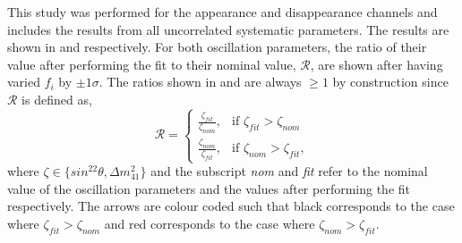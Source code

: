 This study was performed for the \nue appearance and disappearance channels and includes the results from all uncorrelated systematic parameters. The results are shown in  and  respectively. For both oscillation parameters, the ratio of their value after performing the fit to their nominal value, $\mathcal{R}$, are shown after having varied $f_i$ by $\pm 1 \sigma$. The ratios shown in  and  are always $\geq 1$ by construction since $\mathcal{R}$ is defined as,
\begin{equation}
    \mathcal{R} = \begin{cases}
    \frac{\zeta_{fit}}{\zeta_{nom}}, & \text{if } \zeta_{fit} > \zeta_{nom} \\
    \frac{\zeta_{nom}}{\zeta_{fit}}, &\text{if } \zeta_{nom} > \zeta_{fit},
    \end{cases}
\end{equation}
where $\zeta \in \{sin^22\theta, \Delta m^2_{41}\}$ and the subscript \textit{nom} and \textit{fit} refer to the nominal value of the oscillation parameters and the values after performing the fit respectively. The arrows are colour coded such that black corresponds to the case where $\zeta_{fit} > \zeta_{nom}$ and red corresponds to the case where $\zeta_{nom} > \zeta_{fit}$.

